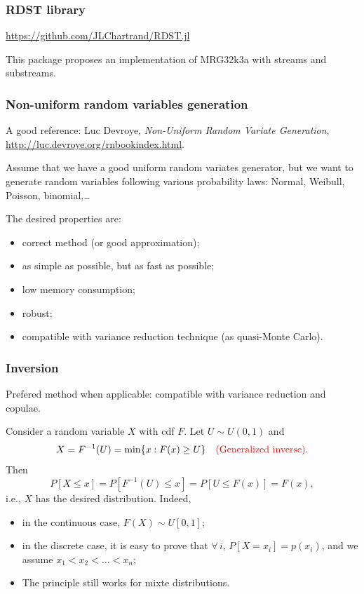 \documentclass{beamer}
\begin{document}
		\begin{frame}[containsverbatim]
	\frametitle{RDST library}
	
	\url{https://github.com/JLChartrand/RDST.jl}		
	
	\mbox{}
	
	This package proposes an implementation of MRG32k3a with streams and substreams.
	
\end{frame}

	\begin{frame}
		\frametitle{Non-uniform random variables generation}
		\label{chap:nonuniform}
		
		A good reference: Luc Devroye, \textsl{Non-Uniform
			Random Variate Generation},
		\url{http://luc.devroye.org/rnbookindex.html}.
		
		\mbox{}
		
		Assume that we have a good uniform random variates generator, but we
		want to generate random variables following various probability laws:
		Normal, Weibull, Poisson, binomial,\ldots
		
		\mbox{}
		
		The desired properties are:
		\begin{itemize}
			\item
			correct method (or good approximation);
			\item
			as simple as possible, but as fast as possible;
			\item
			low memory consumption;
			\item
			robust;
			\item
			compatible with variance reduction technique (as quasi-Monte Carlo).
		\end{itemize}
		
	\end{frame}
	
	\begin{frame}
		\frametitle{Inversion}
		
		Prefered method when applicable: compatible with variance reduction and copulae.
		
		\mbox{}
		
		Consider a random variable $X$ with cdf $F$.
		Let $U \sim U (0, 1)$ and
		\[
		X = F^{-1}(U) = \min \lbrace x : F (x)  \geq U \rbrace \quad \textrm{\textcolor{red}{(Generalized inverse)}}.
		\]
		Then
		\[
		P [X \leq x] = P [F^{-1}(U) \leq x] = P [U \leq F (x)] = F (x),
		\]
		i.e., $X$ has the desired distribution.
		Indeed,
		\begin{itemize}
			\item
			in the continuous case, $F(X) \sim U[0,1]$;
			\item
			in the discrete case, it is easy to prove that $\forall\, i$, $P[X = x_i] = p(x_i)$,
			and we assume $x_1 < x_2 < \ldots < x_n$;
			\item
			The principle still works for mixte distributions.
		\end{itemize}
		
	\end{frame}
	
\end{document}
